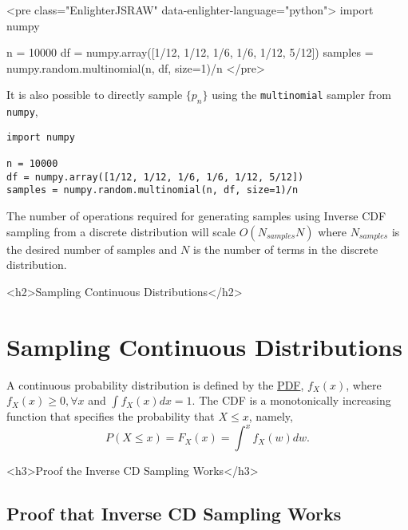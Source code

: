 \documentclass[12pt]{article}
\begin{document}
<pre class="EnlighterJSRAW" data-enlighter-language="python">
import numpy

n = 10000
df = numpy.array([1/12, 1/12, 1/6, 1/6, 1/12, 5/12])
samples = numpy.random.multinomial(n, df, size=1)/n
</pre>
\fi

\iftex
It is also possible to directly sample $\{p_n\}$ using the \texttt{multinomial} sampler from
\texttt{numpy},

\begin{verbatim}
import numpy

n = 10000
df = numpy.array([1/12, 1/12, 1/6, 1/6, 1/12, 5/12])
samples = numpy.random.multinomial(n, df, size=1)/n
\end{verbatim}
\fi

The number of operations required for generating samples using Inverse CDF sampling from a discrete
distribution will scale $O(N_{samples}N)$ where $N_{samples}$ is the desired number of samples
and $N$ is the number of terms in the discrete distribution.

\ifblog
<h2>Sampling Continuous Distributions</h2>
\fi
\iftex
\section{Sampling Continuous Distributions}
\fi

A continuous probability distribution is defined by the  \href{https://en.wikipedia.org/wiki/Probability_density_function}{PDF},
$f_X(x)$, where $f_X(x) \geq 0, \forall x$ and $\int f_X(x) dx = 1.$ The CDF is a monotonically increasing function
that specifies the probability that $X \leq x$, namely,
\begin{equation}
\label{eq:continuous_cdf}
P(X \leq x) = F_X(x) = \int^{x} f_X(w) dw.
\end{equation}

\ifblog
<h3>Proof the Inverse CD Sampling Works</h3>
\fi
\iftex
\subsection{Proof that Inverse CD Sampling Works}
\fi
\end{document}

